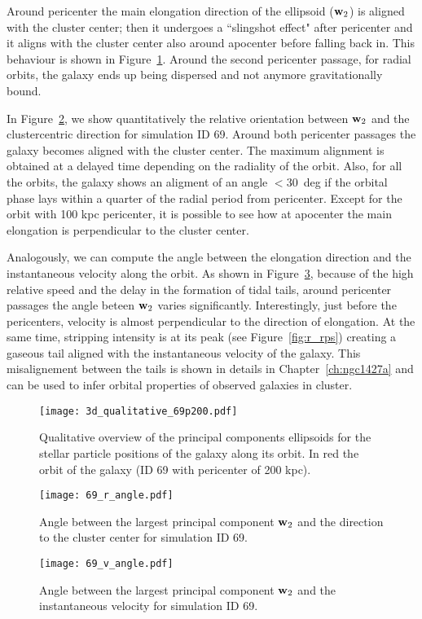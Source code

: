 Around pericenter the main elongation direction of the ellipsoid ($\boldsymbol{\mathbf{w}}_2$) is aligned with the cluster center; then it undergoes a ``slingshot effect" after pericenter and it aligns with the cluster center also around apocenter before falling back in. This behaviour is shown in Figure~\ref{fig:pca}.
Around the second pericenter passage, for radial orbits, the galaxy ends up being dispersed and not anymore gravitationally bound.

In Figure~\ref{fig:pca_angle_r}, we show quantitatively the relative orientation between $\boldsymbol{\mathbf{w}}_2$ and the clustercentric direction for simulation ID 69.
Around both pericenter passages the galaxy becomes aligned with the cluster center.
The maximum alignment is obtained at a delayed time depending on the radiality of the orbit.
Also, for all the orbits, the galaxy shows an aligment of an angle $<30$~deg if the orbital phase lays within a quarter of the radial period from pericenter. %
Except for the orbit with 100 kpc pericenter, it is possible to see how at apocenter the main elongation is perpendicular to the cluster center. %

Analogously, we can compute the angle between the elongation direction and the instantaneous velocity along the orbit.
As shown in Figure~\ref{fig:pca_angle_v}, because of the high relative speed and the delay in the formation of tidal tails, around pericenter passages the angle beteen $\boldsymbol{\mathbf{w}}_2$ varies significantly.
Interestingly, just before the pericenters, velocity is almost perpendicular to the direction of elongation.
At the same time, stripping intensity is at its peak (see Figure~\ref{fig:r_rps}) creating a gaseous tail aligned with the instantaneous velocity of the galaxy.
This misalignement between the tails is shown in details in Chapter~\ref{ch:ngc1427a} and can be used to infer orbital properties of observed galaxies in cluster.

\begin{figure}
\centering
\texttt{[image: 3d\_qualitative\_69p200.pdf]}
\caption{Qualitative overview of the principal components ellipsoids for the stellar particle positions of the galaxy along its orbit.
In red the orbit of the galaxy (ID 69 with pericenter of 200 kpc).}
\label{fig:pca}
\end{figure}

\begin{figure}
\centering
\texttt{[image: 69\_r\_angle.pdf]}
\caption{Angle between the largest principal component $\boldsymbol{\mathbf{w}}_2$ and the direction to the cluster center for simulation ID 69.}
\label{fig:pca_angle_r}
\end{figure}
\begin{figure}
\centering
\texttt{[image: 69\_v\_angle.pdf]}
\caption{Angle between the largest principal component $\boldsymbol{\mathbf{w}}_2$ and the instantaneous velocity for simulation ID 69.}
\label{fig:pca_angle_v}
\end{figure}

